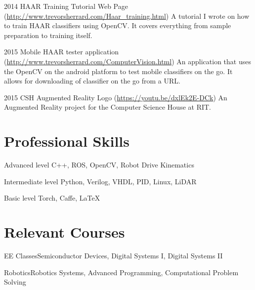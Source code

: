\documentclass{tccv}
\begin{document}
\begin{yearlist}

\item{2014}
     {HAAR Training Tutorial Web Page (\href{http://www.trevorsherrard.com/Haar_training.html}{http://www.trevorsherrard.com\newline/Haar\_training.html})}
     {A tutorial I wrote on how to train HAAR classifiers using OpenCV. It covers everything from sample preparation to training itself.}
     
\item{2015}
     {Mobile HAAR tester application (\href{http://www.trevorsherrard.com/ComputerVision.html}{http://www.trevorsherrard.com\newline/ComputerVision.html})}
     {An application that uses the OpenCV on the android platform to test mobile classifiers on the go. It allows for downloading of classifier on the go from a URL.}
     
\item{2015}
     {CSH Augmented Reality Logo (\href{https://youtu.be/dxlEk2E-DCk}{https://youtu.be/dxlEk2E-DCk})}
     {An Augmented Reality project for the Computer Science House at RIT.}

\end{yearlist}


\section{Professional Skills}
\begin{factlist}

\item{Advanced  level}
     {C++, ROS, OpenCV, Robot Drive Kinematics}

\item{Intermediate level}
     {Python, Verilog, VHDL, PID, Linux, LiDAR}

\item{Basic level}
     {Torch, Caffe, \LaTeX}

\end{factlist}

\section{Relevant Courses}
\begin{factlist}

\item{EE Classes}{Semiconductor Devices, Digital Systems I, Digital Systems II}

\item{Robotics}{Robotics Systems, Advanced Programming, Computational Problem Solving}

\end{factlist}
\end{document}
